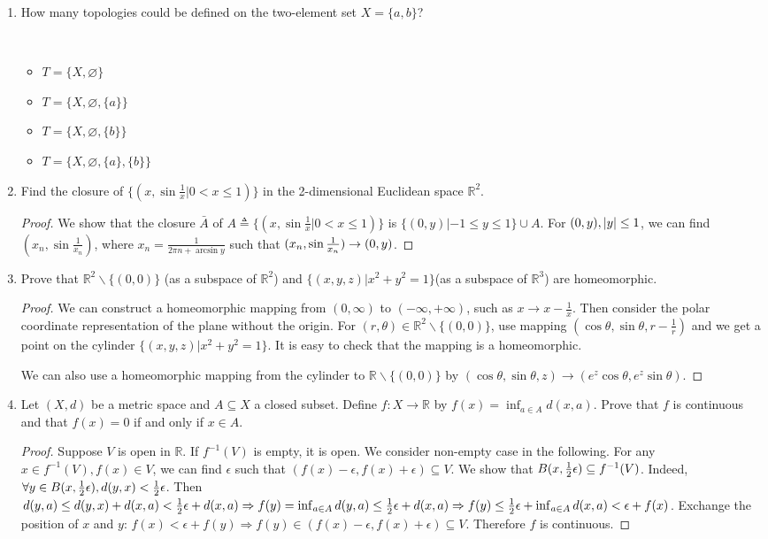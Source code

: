 \documentclass{article}
\DeclarePairedDelimiter\abs{\lvert}{\rvert}
\def\emptyset{\varnothing}
\begin{document}
\courseheader
{}
\begin{enumerate}
\item How many topologies could be defined on the two-element set $X=\{a,b\}$?
\begin{solution}
\quad\\
\begin{itemize}
\item $T=\{X,\emptyset\}$
\item $T=\{X,\emptyset,\{a\}\}$
\item $T=\{X,\emptyset,\{b\}\}$
\item $T=\{X,\emptyset,\{a\},\{b\}\}$
\end{itemize}
\end{solution}
\item Find the closure of $\{(x,\sin \frac{1}{x}| 0<x\leq 1)\}$ in the 2-dimensional Euclidean space $\mathbb{R}^2$.
\begin{proof}%
We show that the closure $\bar{A}$ of $A \triangleq \{(x,\sin \frac{1}{x}| 0<x\leq 1)\}$ is $ \{(0,y)|-1\leq y\leq 1\}\cup A$.
For $(0,y),\abs{y}\leq 1$, we can find $(x_n,\sin\frac{1}{x_n})$, where $x_n=\frac{1}{2\pi n +\arcsin y}$ such that $(x_n,\sin {1\over x_n}) \to (0,y)$.
\end{proof}

\item Prove that $\mathbb{R}^2\backslash\{(0,0)\}$ (as a subspace of $\mathbb{R}^2$) and $\{(x,y,z)|x^2+y^2=1\}$(as a subspace of $\mathbb{R}^3$) are homeomorphic.
\begin{proof}
We can construct a homeomorphic mapping from  $(0,\infty)$ to $(-\infty,+\infty)$, 
such as $x\to x-\frac{1}{x}$. Then consider the polar coordinate representation of the plane without the origin. 
For $(r,\theta)  \in \mathbb{R}^2\backslash\{(0,0)\}$, use mapping $(\cos\theta,\sin\theta,r-\frac{1}{r})$ and we get a point on the cylinder $\{(x,y,z)|x^2+y^2=1\}$. 
It is easy to check that the mapping is a homeomorphic.

We can also use a homeomorphic mapping from the cylinder to $\mathbb{R}\backslash \{(0,0)\}$ by $(\cos\theta, \sin\theta, z)\to (e^z \cos\theta, e^z \sin\theta)$.
\end{proof}
\item Let $(X,d)$ be a metric space and $A\subseteq X$ a closed subset. Define $f:  X\to \mathbb{R}$ by $f(x) = \inf_{a\in A} d(x,a)$. Prove that $f$ is continuous and that $f(x)=0$ if and only if $x\in A$.
\begin{proof}
Suppose $V$ is open in $\mathbb{R}$. If $f^{-1}(V)$ is empty, it is open. We consider non-empty case in the following.
For any $x\in f^{-1}(V),f(x)\in V$, we can find $\epsilon$ such that $(f(x)-\epsilon,f(x)+\epsilon)\subseteq V$.
We show that $B(x,{1\over 2}\epsilon) \subseteq f^{-1}(V)$. Indeed, $\forall y \in B(x,{1\over 2}\epsilon),d(y,x)<{1 \over 2}\epsilon$. Then $d(y,a)\leq d(y,x)+d(x,a)<{1 \over 2}\epsilon+d(x,a) \Rightarrow f(y)=\inf_{a\in A}d(y,a)\leq {1\over 2}\epsilon+d(x,a) \Rightarrow f(y)\leq {1\over 2}\epsilon+\inf_{a\in A}d(x,a)<\epsilon+f(x)$. 
Exchange the position of $x$ and $y$: $f(x)< \epsilon+f(y) \Rightarrow f(y)\in (f(x)-\epsilon,f(x)+\epsilon)\subseteq V$.
Therefore $f$ is continuous.


\end{proof}
\end{enumerate}
\end{document}
